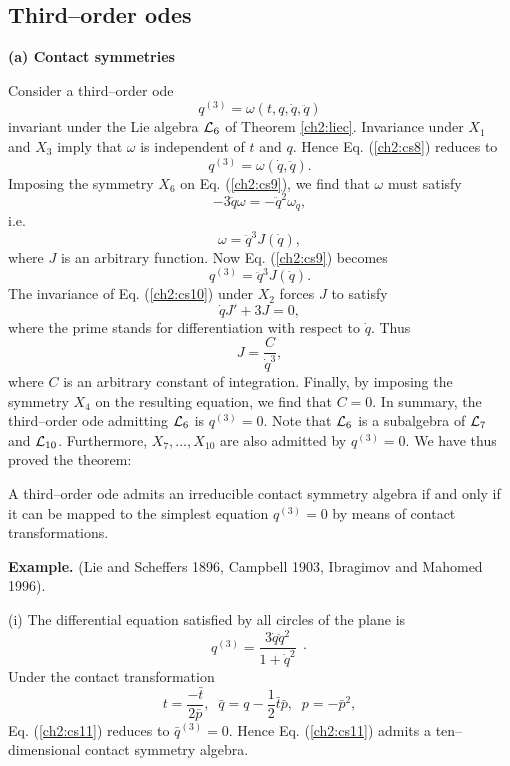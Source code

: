 \subsection{Third--order odes}
{\bf (a) Contact symmetries} 

Consider a third--order ode
\begin{equation}
\label{ch2:cs8}
q^{(3)}=\omega (t,q,\dot q,\ddot q)
\end{equation}
invariant under the Lie algebra ${\cal L}_6$ of Theorem \ref{ch2:liec}. Invariance under
$X_1$ and $X_3$ imply that $\omega$ is independent of $t$ and $q$. Hence Eq.
(\ref{ch2:cs8}) reduces to
\begin{equation}
\label{ch2:cs9}
q^{(3)}=\omega (\dot q,\ddot q).
\end{equation}
Imposing the symmetry $X_6$ on Eq. (\ref{ch2:cs9}), we find that $\omega$
must satisfy
\[-3\ddot q \omega =-\ddot q^2 \omega_{\ddot q},\]
i.e.
\[\omega=\ddot q^3J(\dot q),\]
where $J$ is an arbitrary function. Now Eq. (\ref{ch2:cs9}) becomes
\begin{equation}
\label{ch2:cs10}
q^{(3)}=\ddot q^3J(\dot q).
\end{equation}
The invariance of  Eq. (\ref{ch2:cs10}) under $X_2$  forces $J$ to satisfy
\[\dot q J'+3J=0,\]
where the prime stands for differentiation with respect to $\dot q$. Thus
\[J=\frac{C}{\dot q^{3}},\]
where $C$  is an arbitrary constant of integration. Finally, by imposing the
symmetry $X_4$ on the resulting equation, we find that $C=0$. In summary,
the third--order ode admitting ${\cal L}_6$ is $q^{(3)}=0$. Note that ${\cal L}_6$ is a
subalgebra of ${\cal L}_7$ and ${\cal L}_{10}$. Furthermore, $X_7,\ldots ,X_{10}$ are also admitted
by $q^{(3)}=0$. We have thus proved the theorem:
\begin{theo}
\label{ch2:3cont}
\begin{em}
A third--order ode admits an irreducible contact symmetry algebra if and only
if it can be mapped to the simplest equation $q^{(3)}=0$ by means of contact
transformations.
\end{em}
\end{theo}
{\bf Example.} (Lie and Scheffers 1896, Campbell 1903, Ibragimov and
Mahomed 1996). 

(i) The  differential equation satisfied by all circles of the plane is
\begin{equation}
\label{ch2:cs11}
q^{(3)}=\frac{3\dot q \ddot q^2}{1+\dot q^2}\;\cdot
\end{equation}
Under the contact transformation
\begin{equation}
\label{ch2:cs12}
t= \frac{-\bar t}{2\bar p},\;\; \bar q=q-\frac{1}{2}\bar t\bar p,\;\;
p=-{\bar p}^2,
\end{equation}
Eq. (\ref{ch2:cs11}) reduces to $\bar q^{(3)}=0$. Hence Eq. (\ref{ch2:cs11}) admits a
ten--dimensional contact symmetry algebra. 


